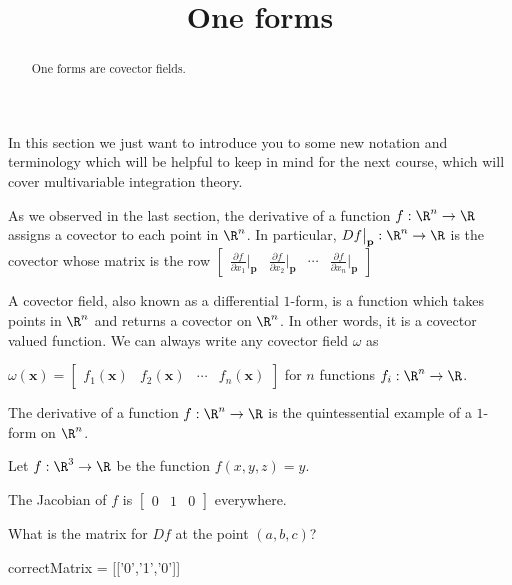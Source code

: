 \documentclass{ximera}
\title{One forms}
\begin{document}
	\begin{abstract}
		One forms are covector fields.
	\end{abstract}
	
	In this section we just want to introduce you to some new notation and terminology which will be helpful to keep in mind for the next course, which
	will cover multivariable integration theory.
	
	As we observed in the last section, the derivative of  a function $f:\R^n \to \R$ assigns a covector to each point in $\R^n$.  In particular,
	$Df\big|_{\mathbf{p}} : \R^n \to \R$ is the covector whose matrix is the row 
	\(\begin{bmatrix} \frac{\partial f}{\partial x_1}\big|_{\mathbf{p}} & \frac{\partial f}{\partial x_2}\big|_{\mathbf{p}} & \cdots & \frac{\partial f}{\partial x_n}\big|_{\mathbf{p}}\end{bmatrix}\)
	
	\begin{definition}
		A covector field, also known as a differential $1$-form, is a function which takes points in $\R^n$ and returns a covector on $\R^n$.  In other words, it is a covector
		valued function.  We can always write any covector field $\omega$ as
		
		$\omega(\mathbf{x}) = \begin{bmatrix} f_1(\mathbf{x}) &  f_2(\mathbf{x}) & \cdots &  f_n(\mathbf{x})  \end{bmatrix}$ for $n$ functions $f_i:\R^n \to \R$.
	\end{definition}
	
	The derivative of a function $f:\R^n \to \R$ is the quintessential example of a $1$-form on $\R^n$.
	
	\begin{question}
		Let $f:\R^3 \to \R$ be the function $f(x,y,z)= y$. 
		\begin{solution}
		\begin{hint}
			The Jacobian of $f$ is  $\begin{bmatrix} 0&1&0 \end{bmatrix}$ everywhere.
		\end{hint}
		 What is the matrix for $Df$ at the point $(a,b,c)$?
		 	\begin{matrix-answer}
		 		correctMatrix = [['0','1','0']]
		 	\end{matrix-answer}
		 \end{solution}
	\end{question}
	
\end{document}
